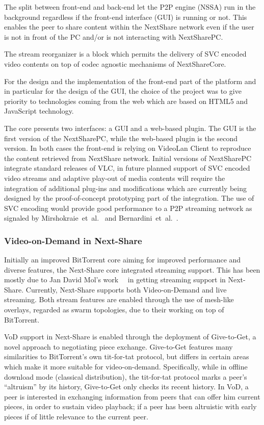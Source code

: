 The split between front-end and back-end let the P2P engine (NSSA) run in the
background regardless if the front-end interface (GUI) is running or not. This
enables the peer to share content within the NextShare network even if the
user is not in front of the PC and/or is not interacting with NextSharePC.

The stream reorganizer is a block which permits the delivery of SVC encoded
video contents on top of codec agnostic mechanisms of NextShareCore.

For the design and the implementation of the front-end part of the platform
and in particular for the design of the GUI, the choice of the project was to
give priority to technologies coming from the web which are based on HTML5 and
JavaScript technology.

The core presents two interfaces: a GUI and a web-based plugin. The GUI is the
first version of the NextSharePC, while the web-based plugin is the second
version. In both cases the front-end is relying on VideoLan Client to
reproduce the content retrieved from NextShare network. Initial versions of
NextSharePC integrate standard releases of VLC, in future planned support of
SVC encoded video streams and adaptive play-out of media contents will require
the integration of additional plug-ins and modifications which are currently
being designed by the proof-of-concept prototyping part of the integration.
The use of SVC encoding would provide good performance to a P2P streaming
network as signaled by Mirshokraie~et~al.~\cite{p2p-streaming-svc} and
Bernardini~et~al.~\cite{p2p-streaming-net-coding}.

\subsubsection{Video-on-Demand in Next-Share}

Initially an improved BitTorrent core aiming for improved performance and
diverse features, the Next-Share core integrated streaming support. This has
been mostly due to Jan David Mol's
work~\cite{give-to-get}~\cite{design-p2p-live} in getting streaming
support in Next-Share. Currently, Next-Share supports both Video-on-Demand
and live streaming. Both stream features are enabled through the use of
mesh-like overlays, regarded as swarm topologies, due to their working on top
of BitTorrent.

VoD support in Next-Share is enabled through the deployment of Give-to-Get, a
novel approach to negotiating piece exchange. Give-to-Get features many
similarities to BitTorrent's own tit-for-tat protocol, but differs in certain
areas which make it more suitable for video-on-demand. Specifically, while in
offline download mode (classical distribution), the tit-for-tat protocol marks
a peer's ``altruism'' by its history, Give-to-Get only checks its recent
history. In VoD, a peer is interested in exchanging information from peers that
can offer him current pieces, in order to sustain video playback; if a peer
has been altruistic with early pieces if of little relevance to the current
peer.


